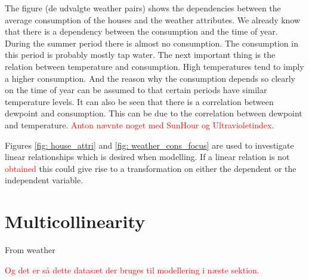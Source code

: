 The figure (de udvalgte weather pairs) shows the dependencies between the average consumption of the houses and the weather attributes.
We already know that there is a dependency between the consumption and the time of year. During the summer period there
is almost no consumption. The consumption in this period is probably mostly tap water. The next important thing is the relation
between temperature and consumption. High temperatures tend to imply a higher consumption. And the reason why the consumption
depends so clearly on the time of year can be assumed to that certain periods have similar temperature levels. 
It can also be seen that there is a correlation between dewpoint and consumption. This can be due to the correlation between dewpoint and temperature. \textcolor{red}{Anton nævnte noget med SunHour og Ultravioletindex.}

Figures \ref{fig: house_attri} and \ref{fig: weather_cons_focus} are used to investigate linear relationships which is desired when modelling. If a linear relation is not \textcolor{red}{obtained} this could give rise to a transformation on either the dependent or the independent variable.  

\section{Multicollinearity}
From weather



\textcolor{red}{Og det er så dette datasæt der bruges til modellering i næste sektion.}